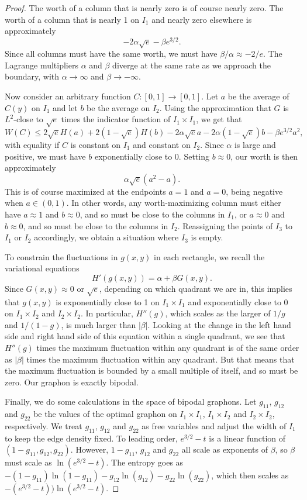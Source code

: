 \documentclass[12pt]{amsart}
\newcommand\be{\begin{equation}}
\newcommand\ee{\end{equation}}
\newcommand{\Value}{worth}
\begin{document}
{\begin{proof}
The \Value{} of a column that is nearly zero is of course nearly zero.
The \Value{} of a column that is nearly 1 on $I_1$ and nearly zero
elsewhere is approximately 
\be - 2\alpha \sqrt{e} - \beta e^{3/2}. \ee
Since all columns must have the same \Value, we must have 
$\beta/\alpha \approx -2/e$. The Lagrange multipliers $\alpha$
and $\beta$ diverge at the same rate as we approach the boundary,
with $\alpha \to \infty$ and $\beta \to -\infty$. 

Now consider an arbitrary function $C: [0,1] \to [0,1]$. 
Let $a$ be the 
average of $C(y)$ on $I_1$ and let $b$ be the average on $I_2$. 
Using the approximation that $G$ is $L^2$-close to $\sqrt{e}$ 
times the indicator function of $I_1 \times I_1$, we get that 
\be W(C) \le 2\sqrt{e} H(a) + 2(1-\sqrt{e}) H(b) - 2\alpha \sqrt{e} a
- 2\alpha (1-\sqrt{e}) b - \beta e^{3/2} a^2, \ee
with equality if $C$ is constant on $I_1$ and constant on $I_2$. 
Since $\alpha$ is large and positive, we must have $b$ exponentially
close to 0. Setting $b \approx 0$, our \Value{} is then approximately
\be \alpha \sqrt{e} (a^2 - a). \ee
This is of course maximized at the endpoints $a=1$ and $a=0$, 
being negative when $a \in (0,1)$. In other words, 
any \Value-maximizing column must either have $a \approx 1$ and 
$b \approx 0$, and so must be close to the columns in $I_1$, or 
$a \approx 0$ and $b \approx 0$, and so must be close to the 
columns in $I_2$. Reassigning the points of $I_3$ to $I_1$ or $I_2$
accordingly, we obtain a situation where $I_3$ is empty. 

To constrain the fluctuations in $g(x,y)$ in each rectangle, we
recall the variational equations 
\be H'(g(x,y)) = \alpha + \beta G(x,y). \ee
Since $G(x,y) \approx 0$ or $\sqrt{e}$, depending on which 
quadrant we are in, this implies that $g(x,y)$ is exponentially 
close to 1 on $I_1 \times I_1$ and exponentially close to 
0 on $I_1 \times I_2$ and $I_2 \times I_2$. In particular, $H''(g)$,
which scales as the larger of $1/g$ and $1/(1-g)$, is much larger
than $|\beta|$. Looking at the change in the left hand side and 
right hand side of this equation within a single quadrant, we 
see that $H''(g)$ times the maximum fluctuation within any quadrant
is of the same order as $|\beta|$ times the maximum fluctuation 
within any quadrant. But that means that the maximum fluctuation is 
bounded by a small multiple of itself, and so must be zero. Our 
graphon is exactly bipodal. 

Finally, we do some calculations in the space of bipodal graphons. 
Let $g_{11}$, $g_{12}$ and $g_{22}$ be the values of the
optimal graphon on $I_1 \times I_1$, $I_1 \times I_2$ and $I_2 \times I_2$,
respectively. We treat $g_{11}$, $g_{12}$ and $g_{22}$ as free variables
and adjust the width of $I_1$ to keep the edge density fixed. To 
leading order, $e^{3/2}-t$ is a linear function of $(1-g_{11}, g_{12},
g_{22})$. However, $1-g_{11}$, $g_{12}$ and $g_{22}$ all scale as 
exponents of $\beta$, so $\beta$ must scale as $\ln(e^{3/2}-t)$. 
The entropy goes as $-(1-g_{11})\ln(1-g_{11}) - g_{12} \ln(g_{12})
- g_{22} \ln(g_{22})$, which then scales as $-(e^{3/2}-t)) \ln(e^{3/2}-t)$.


\end{proof}}
\end{document}
